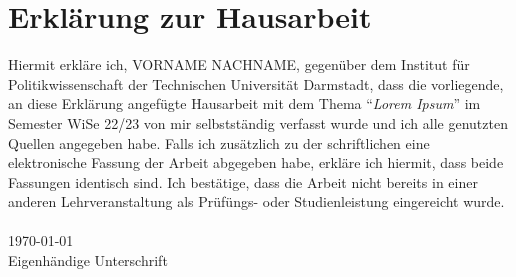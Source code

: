 \begin{doublespace}
\pagebreak

\pagebreak
\end{doublespace}
\printglossary[type=\acronymtype,title={Abkürzungsverzeichnis},nonumberlist]
\pagebreak
\section*{Erklärung zur Hausarbeit}
Hiermit erkläre ich, VORNAME NACHNAME, gegenüber dem Institut für Politikwissenschaft der Technischen Universität Darmstadt, dass die vorliegende, an diese Erklärung angefügte Hausarbeit mit dem Thema \enquote{\textit{Lorem Ipsum}} im Semester WiSe 22/23 von mir selbstständig verfasst wurde und ich alle genutzten Quellen angegeben habe. Falls ich zusätzlich zu der schriftlichen eine elektronische Fassung der Arbeit abgegeben habe, erkläre ich hiermit, dass beide Fassungen identisch sind. Ich bestätige, dass die Arbeit nicht bereits in einer anderen Lehrveranstaltung als Prüfüngs- oder Studienleistung eingereicht wurde.\\
\\
\today \\
\newline
\newline
Eigenhändige Unterschrift
\newpage
\endcm